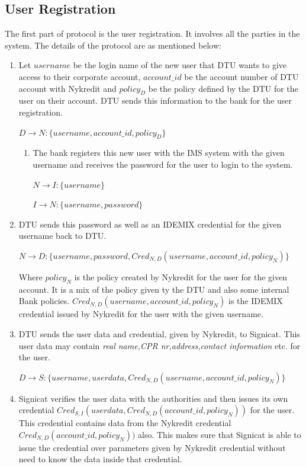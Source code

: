 \subsection{User Registration}
The first part of protocol is the user registration. It involves all the parties in the system. The details of the protocol are as mentioned below:
\begin{enumerate} 
\item 	Let  $username$ be the login name of the new user that DTU wants to give access to their corporate account, $account\_id$ be the account number of DTU account with Nykredit and $policy_D$ be the policy defined by the DTU for the user on their account. DTU sends this information to the bank for the user registration.

\begin{center}
	$D \rightarrow N : \{username,account\_id,policy_D\}$
\end{center}
\begin{enumerate}
	\item The bank registers this new user with the IMS system with the given username and receives the password for the user to login to the system.
	\begin{center}
		$N \rightarrow I : \{username\}$
		
		$I \rightarrow N : \{username,password\}$
		
	\end{center}	
\end{enumerate}
\item DTU sends this password as well as an IDEMIX credential for the given username back to DTU.
	\begin{center}
		$N \rightarrow D : \{username,password,Cred_{N,D}(username,account\_id,policy_N)\}$
	\end{center}	
Where $policy_N$ is the policy created by Nykredit for the user for the given account. It is a mix of the policy given ty the DTU and also some internal Bank policies. $Cred_{N,D}(username,account\_id,policy_N)$ is the IDEMIX credential issued by Nykredit for the user with the given username.
\item DTU sends the user data and credential, given by Nykredit, to Signicat. This user data may contain \textit{real name,CPR nr,address,contact information} etc. for the user. 
\begin{center}
	$D \rightarrow S : \{username,userdata,Cred_{N,D}(username,account\_id,policy_N)\}$
\end{center}
\item Signicat verifies the user data with the authorities and then issues its own credential $Cred_{S,I}(userdata,Cred_{N,D}(account\_id,policy_N))$ for the user. This credential contains data from the Nykredit credential $Cred_{N,D}(account\_id,policy_N))$ also. This makes sure that Signicat is able to issue the credential over parameters given by Nykredit credential without need to know the data inside that credential.


\end{enumerate}
